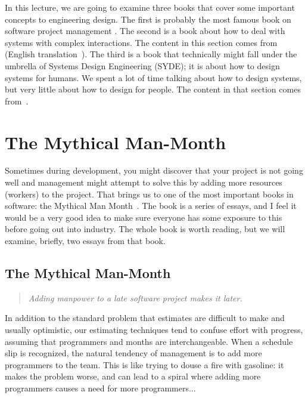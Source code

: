 




In this lecture, we are going to examine three books that cover some important concepts to engineering design. The first is probably the most famous book on software project management \cite{mmm}. The second is a book about how to deal with systems with complex interactions. The content in this section comes from~\cite{lofde} (English translation~\cite{lof}). The third is a book that technically might fall under the umbrella of Systems Design Engineering (SYDE); it is about how to design systems for humans. We spent a lot of time talking about how to design systems, but very little about how to design for people. The content in that section comes from~\cite{thf}.


\section*{The Mythical Man-Month}
Sometimes during development, you might discover that your project is not going well and management might attempt to solve this by adding more resources (workers) to the project. That brings us to one of the most important books in software: the Mythical Man Month~\cite{mmm}. The book is a series of essays, and I feel it would be a very good idea to make sure everyone has some exposure to this before going out into industry. The whole book is worth reading, but we will examine, briefly, two essays from that book.

\subsection*{The Mythical Man-Month}
\begin{quote}
	\textit{Adding manpower to a late software project makes it later.}
\end{quote}

In addition to the standard problem that estimates are difficult to make and usually optimistic, our estimating techniques tend to confuse effort with progress, assuming that programmers and months are interchangeable. When a schedule slip is recognized, the natural tendency of management is to add more programmers to the team. This is like trying to douse a fire with gasoline: it makes the problem worse, and can lead to a spiral where adding more programmers causes a need for more programmers...

